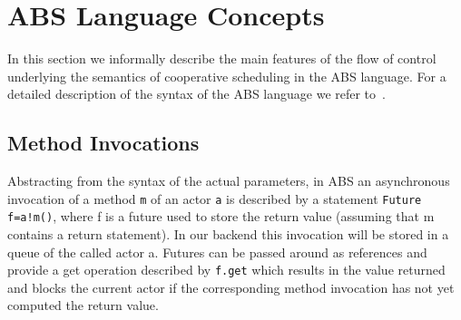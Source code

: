 

\section{ABS Language Concepts}
\label{lang}
In this section we informally describe the main features of the flow of control
underlying the semantics of cooperative scheduling in the ABS language.
For a detailed description of the syntax of the ABS language we refer to~\cite{abs}.


\subsection{Method Invocations}\label{amc}

Abstracting from the syntax of the actual parameters,
in ABS an asynchronous invocation of a method \texttt{m} of an actor \texttt{a} is described by a statement
\texttt{Future f=a!m()}, where f is a future used to store the return value
(assuming that m contains a return statement).
In our backend this invocation will be stored in a queue of the called actor a.
Futures can be passed around as references and provide a get operation
described by \texttt{f.get} which results in the value returned and blocks
the current actor if the corresponding method invocation has not yet computed
the return value.

